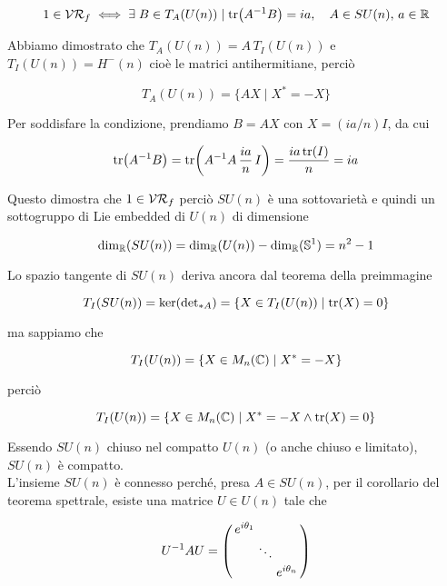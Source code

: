 \begin{equation}
	1 \in \VR_{f} \iff \E B \in T_{A}(U(n)) \mid \tr(A^{-1} B) = i a \qcomma A \in SU(n), \, a \in \R
\end{equation}

Abbiamo dimostrato che $ T_{A}(U(n)) = A \, T_{I}(U(n)) $ e $ T_{I}(U(n)) = H^{-}(n) $ cioè le matrici antihermitiane, perciò

\begin{equation}
	T_{A}(U(n)) = \{ AX \mid X^{*} = -X \}
\end{equation}

Per soddisfare la condizione, prendiamo $ B = AX $ con $ X = (i a/n) I $, da cui

\begin{equation}
	\tr(A^{-1} B) = \tr(A^{-1} A \, \dfrac{ia}{n} \, I) = \dfrac{ia \tr(I)}{n} = i a
\end{equation}

Questo dimostra che $ 1 \in \mathcal{VR}_{f} $ perciò $ SU(n) $ è una sottovarietà e quindi un sottogruppo di Lie embedded di $ U(n) $ di dimensione

\begin{equation}
	\dim_{\mathbb{R}}(SU(n)) = \dim_{\mathbb{R}}(U(n)) - \dim_{\mathbb{R}}(\mathbb{S}^{1}) = n^{2} - 1
\end{equation}

Lo spazio tangente di $ SU(n) $ deriva ancora dal teorema della preimmagine

\begin{equation}
	T_{I}(SU(n)) = \ker(\operatorname{det}_{*A}) = \{ X \in T_{I}(U(n)) \mid \tr(X) = 0 \}
\end{equation}

ma sappiamo che

\begin{equation}
	T_{I}(U(n)) = \{ X \in M_{n}(\mathbb{C}) \mid X^{*} = - X \}
\end{equation}

perciò

\begin{equation}
	T_{I}(U(n)) = \{ X \in M_{n}(\mathbb{C}) \mid X^{*} = -X \wedge \tr(X) = 0 \}
\end{equation}

Essendo $ SU(n) $ chiuso nel compatto $ U(n) $ (o anche chiuso e limitato), $ SU(n) $ è compatto.\\
L'insieme $ SU(n) $ è connesso perché, presa $ A \in SU(n) $, per il corollario del teorema spettrale, esiste una matrice $ U \in U(n) $ tale che

\begin{equation}
	U^{-1} A U = %
	\smqty(\dmat{ e^{i \theta_{1}}, \ddots, e^{i \theta_{n}} })
\end{equation}

